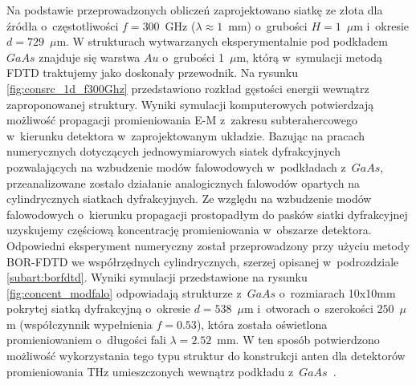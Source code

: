 Na podstawie przeprowadzonych obliczeń zaprojektowano siatkę ze złota dla źródła o~częstotliwości $f=300$~GHz ($\lambda\approx 1$~mm) o~grubości $H=1$~$\mu$m i~okresie $d=729$~$\mu$m. W strukturach wytwarzanych eksperymentalnie pod podkładem $GaAs$ znajduje się warstwa $Au$ o~grubości 1~$\mu$m, którą w~symulacji metodą FDTD traktujemy jako doskonały przewodnik. Na rysunku \ref{fig:consrc_1d_f300Ghz} przedstawiono rozkład gęstości energii wewnątrz zaproponowanej struktury. Wyniki symulacji komputerowych potwierdzają  możliwość propagacji promieniowania E-M z~zakresu subterahercowego w~kierunku detektora w~zaprojektowanym układzie.
Bazując na pracach numerycznych dotyczących  jednowymiarowych siatek dyfrakcyjnych pozwalających na wzbudzenie modów falowodowych w~podkładach z~$GaAs$, przeanalizowane zostało działanie analogicznych falowodów opartych na cylindrycznych siatkach dyfrakcyjnych. Ze względu na wzbudzenie modów falowodowych o~kierunku propagacji prostopadłym do pasków siatki dyfrakcyjnej uzyskujemy częściową koncentrację promieniowania w~obszarze detektora. Odpowiedni eksperyment numeryczny został przeprowadzony przy użyciu metody BOR-FDTD we współrzędnych cylindrycznych, szerzej opisanej w~podrozdziale \ref{subart:borfdtd}. Wyniki symulacji przedstawione na rysunku \ref{fig:concent_modfalo} odpowiadają strukturze z~$GaAs$ o~rozmiarach 10x10mm pokrytej siatką dyfrakcyjną o~okresie $d=538$~$\mu$m i~otworach o~szerokości $250$~$\mu$m (współczynnik wypełnienia $f=0.53$), która została oświetlona promieniowaniem o~długości fali $\lambda=2.52$~mm. W ten sposób potwierdzono możliwość wykorzystania tego typu struktur do konstrukcji anten dla detektorów promieniowania THz umieszczonych wewnątrz podkładu z~$GaAs$~\cite{Stolarek2011}.

